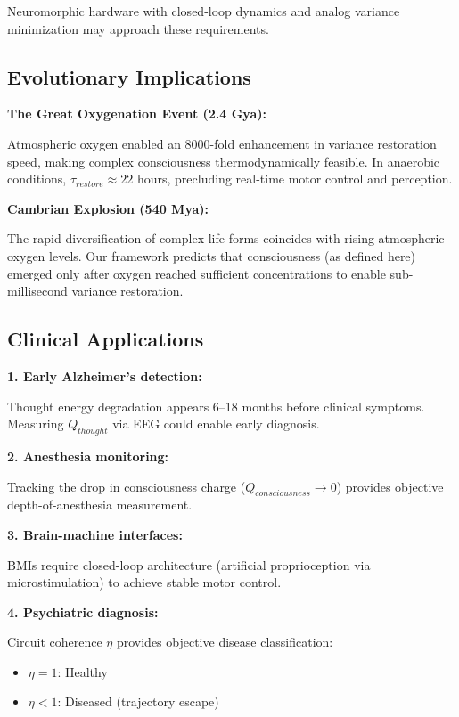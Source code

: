 \documentclass[12pt,a4paper]{article}
\begin{document}
Neuromorphic hardware with closed-loop dynamics and analog variance minimization may approach these requirements.

\subsection{Evolutionary Implications}

\textbf{The Great Oxygenation Event (2.4 Gya):}

Atmospheric oxygen enabled an 8000-fold enhancement in variance restoration speed, making complex consciousness thermodynamically feasible. In anaerobic conditions, $\tau_{restore} \approx 22$ hours, precluding real-time motor control and perception.

\textbf{Cambrian Explosion (540 Mya):}

The rapid diversification of complex life forms coincides with rising atmospheric oxygen levels. Our framework predicts that consciousness (as defined here) emerged only after oxygen reached sufficient concentrations to enable sub-millisecond variance restoration.

\subsection{Clinical Applications}

\textbf{1. Early Alzheimer's detection:}

Thought energy degradation appears 6--18 months before clinical symptoms. Measuring $Q_{thought}$ via EEG could enable early diagnosis.

\textbf{2. Anesthesia monitoring:}

Tracking the drop in consciousness charge ($Q_{consciousness} \to 0$) provides objective depth-of-anesthesia measurement.

\textbf{3. Brain-machine interfaces:}

BMIs require closed-loop architecture (artificial proprioception via microstimulation) to achieve stable motor control.

\textbf{4. Psychiatric diagnosis:}

Circuit coherence $\eta$ provides objective disease classification:
\begin{itemize}
\item $\eta = 1$: Healthy
\item $\eta < 1$: Diseased (trajectory escape)
\end{itemize}

\end{document}
